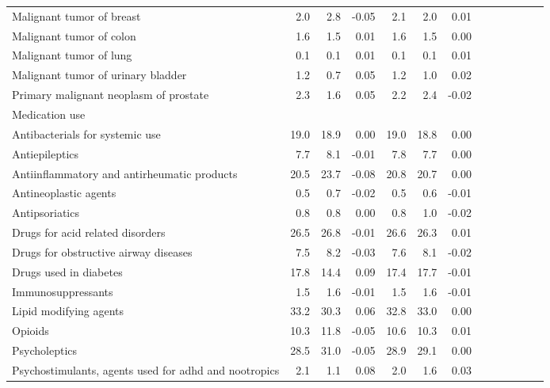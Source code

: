 \documentclass[11pt,]{article}
\begin{document}
\begin{longtable}{lrrrrrrrrrrrr}
      Malignant tumor of breast &  2.0 &  2.8 & -0.05 &  2.1 &  2.0 &  0.01 \\ 
      Malignant tumor of colon &  1.6 &  1.5 &  0.01 &  1.6 &  1.5 &  0.00 \\ 
      Malignant tumor of lung &  0.1 &  0.1 &  0.01 &  0.1 &  0.1 &  0.01 \\ 
      Malignant tumor of urinary bladder &  1.2 &  0.7 &  0.05 &  1.2 &  1.0 &  0.02 \\ 
      Primary malignant neoplasm of prostate &  2.3 &  1.6 &  0.05 &  2.2 &  2.4 & -0.02 \\ 
  Medication use &    &    &     &    &    &     \\ 
      Antibacterials for systemic use & 19.0 & 18.9 &  0.00 & 19.0 & 18.8 &  0.00 \\ 
      Antiepileptics &  7.7 &  8.1 & -0.01 &  7.8 &  7.7 &  0.00 \\ 
      Antiinflammatory and antirheumatic products & 20.5 & 23.7 & -0.08 & 20.8 & 20.7 &  0.00 \\ 
      Antineoplastic agents &  0.5 &  0.7 & -0.02 &  0.5 &  0.6 & -0.01 \\ 
      Antipsoriatics &  0.8 &  0.8 &  0.00 &  0.8 &  1.0 & -0.02 \\ 
      Drugs for acid related disorders & 26.5 & 26.8 & -0.01 & 26.6 & 26.3 &  0.01 \\ 
      Drugs for obstructive airway diseases &  7.5 &  8.2 & -0.03 &  7.6 &  8.1 & -0.02 \\ 
      Drugs used in diabetes & 17.8 & 14.4 &  0.09 & 17.4 & 17.7 & -0.01 \\ 
      Immunosuppressants &  1.5 &  1.6 & -0.01 &  1.5 &  1.6 & -0.01 \\ 
      Lipid modifying agents & 33.2 & 30.3 &  0.06 & 32.8 & 33.0 &  0.00 \\ 
      Opioids & 10.3 & 11.8 & -0.05 & 10.6 & 10.3 &  0.01 \\ 
      Psycholeptics & 28.5 & 31.0 & -0.05 & 28.9 & 29.1 &  0.00 \\ 
      Psychostimulants, agents used for adhd and nootropics &  2.1 &  1.1 &  0.08 &  2.0 &  1.6 &  0.03 \\ 
   \bottomrule\end{longtable}
\clearpage
{}
\end{document}
